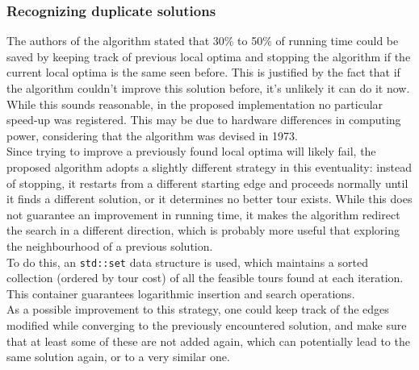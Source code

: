 \subsubsection{Recognizing duplicate solutions}
\label{sssec:checkout}
The authors of the algorithm stated that 30\% to 50\% of running time could be saved by keeping track of previous local optima and stopping the algorithm if the current local optima is the same seen before. This is justified by the fact that if the algorithm couldn't improve this solution before, it's unlikely it can do it now. While this sounds reasonable, in the proposed implementation no particular speed-up was registered. This may be due to hardware differences in computing power, considering that the algorithm was devised in 1973.\\
Since trying to improve a previously found local optima will likely fail, the proposed algorithm adopts a slightly different strategy in this eventuality: instead of stopping, it restarts from a different starting edge and proceeds normally until it finds a different solution, or it determines no better tour exists. While this does not guarantee an improvement in running time, it makes the algorithm redirect the search in a different direction, which is probably more useful that exploring the neighbourhood of a previous solution.\\
To do this, an \texttt{std::set} data structure is used, which maintains a sorted collection (ordered by tour cost) of all the feasible tours found at each iteration. This container guarantees logarithmic insertion and search operations.\\
As a possible improvement to this strategy, one could keep track of the edges modified while converging to the previously encountered solution, and make sure that at least some of these are not added again, which can potentially lead to the same solution again, or to a very similar one.

\clearpage
